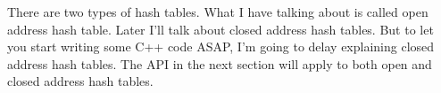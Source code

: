 
There are two types of hash tables.
What I have talking about is called open address hash table.
Later I'll talk about closed address hash tables.
But to let you start writing some C++ code ASAP, 
I'm going to delay explaining closed address hash tables.
The API in the next section will apply to both open and closed
address hash tables.




\newpage
